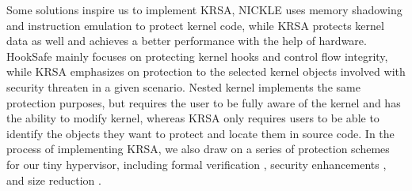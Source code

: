 \documentclass[conference]{IEEEtran}
\begin{document}
Some solutions inspire us to implement KRSA, NICKLE\cite{vmmshadow} uses memory shadowing and instruction emulation to protect kernel code, while KRSA protects kernel data as well and achieves a better performance with the help of hardware. HookSafe\cite{hooksafe} mainly focuses on protecting kernel hooks and control flow integrity, while KRSA emphasizes on protection to the selected kernel objects involved with security threaten in a given scenario.
Nested kernel\cite{nest15} implements the same protection purposes, but requires the user to be fully aware of the kernel and has the ability to modify kernel, whereas KRSA only requires users to be able to identify the objects they want to protect and locate them in source code. In the process of implementing KRSA, we also draw on a series of protection schemes for our tiny hypervisor, including formal verification\cite{sel4,sel413} , security enhancements \cite{memsafe,hypersentry,hyperSafe}, and size reduction \cite{break,nova,seccloud}.

\fi
\end{document}
